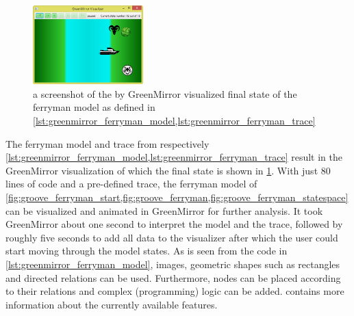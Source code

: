 
\begin{figure}\vspace{-22pt}
  \begin{center}
    \includegraphics[width=0.38\textwidth]{images/greenmirror_ferryman}
  \end{center}
  \vspace{-10pt}\caption{a screenshot of the by GreenMirror visualized final state of the ferryman model as defined in \cref{lst:greenmirror_ferryman_model,lst:greenmirror_ferryman_trace}}\vspace{-20pt}
  \label{fig:greenmirror_ferryman}
\end{figure}
\par The ferryman model and trace from respectively \cref{lst:greenmirror_ferryman_model,lst:greenmirror_ferryman_trace} result in the GreenMirror visualization of which the final state is shown in \cref{fig:greenmirror_ferryman}. With just 80 lines of code and a pre-defined trace, the ferryman model of \cref{fig:groove_ferryman_start,fig:groove_ferryman,fig:groove_ferryman_statespace} can be visualized and animated in GreenMirror for further analysis. It took GreenMirror about one second to interpret the model and the trace, followed by roughly five seconds to add all data to the visualizer after which the user could start moving through the model states. As is seen from the code in \cref{lst:greenmirror_ferryman_model}, images, geometric shapes such as rectangles and directed relations can be used. Furthermore, nodes can be placed according to their relations and complex (programming) logic can be added.  contains more information about the currently available features.